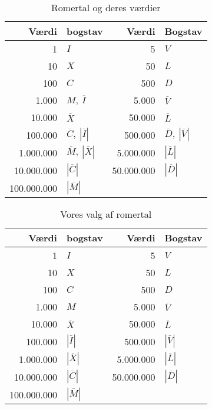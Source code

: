 \begin{table}[h!]
\begin{center}
\begin{tabular}{ | r  l || r  l | }
  \hline                        
  Værdi & bogstav & Værdi & Bogstav \\
  \hline
  1			& $I$ 								& 5				& $V$ \\
  10		& $X$ 								& 50			& $L$ \\
  100		& $C$ 								& 500			& $D$ \\
  1.000		& $M,~\overline{I}$ 				& 5.000			& $\overline{V}$ \\
  10.000	& $\overline{X}$ 					& 50.000		& $\overline{L}$ \\
  100.000	& $\overline{C},~|\overline{I}|$ 	& 500.000		& $\overline{D},~|\overline{V}|$ \\
  1.000.000	& $\overline{M},~|\overline{X}|$ 	& 5.000.000		& $|\overline{L}|$ \\
  10.000.000& $|\overline{C}|$				 	& 50.000.000		& $|\overline{D}|$ \\
  100.000.000& $|\overline{M}|$ & &\\
  \hline  
\end{tabular}
\caption{Romertal og deres værdier}\label{fig:romertal1}
\end{center}
\end{table}

\begin{table}[h!]
\begin{center}
\begin{tabular}{ | r  l || r  l | }
  \hline                        
  Værdi & bogstav & Værdi & Bogstav \\
  \hline
  1			& $I$ 				& 5				& $V$ \\
  10		& $X$ 				& 50			& $L$ \\
  100		& $C$ 				& 500			& $D$ \\
  1.000		& $M$ 				& 5.000			& $\overline{V}$ \\
  10.000	& $\overline{X}$ 	& 50.000		& $\overline{L}$ \\
  100.000	& $|\overline{I}|$ 	& 500.000		& $|\overline{V}|$ \\
  1.000.000	& $|\overline{X}|$ 	& 5.000.000		& $|\overline{L}|$ \\
  10.000.000& $|\overline{C}|$	& 50.000.000		& $|\overline{D}|$ \\
  100.000.000& $|\overline{M}|$ & &\\
  \hline  
\end{tabular}
\caption{Vores valg af romertal}\label{fig:romertal2}
\end{center}
\end{table}